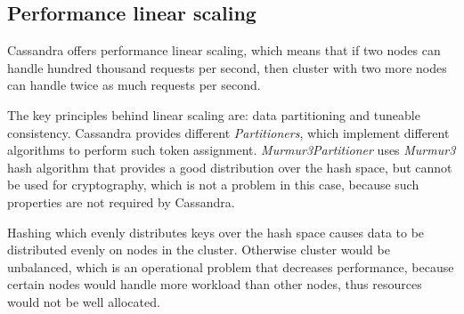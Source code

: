 
\subsection{Performance linear scaling}
\label{sec:theory:cassandra:linear}
Cassandra offers performance linear scaling, which means that if two nodes can handle hundred thousand requests per second, then cluster with two more nodes can handle twice as much requests per second. 

The key principles behind linear scaling are: data partitioning and tuneable consistency. 
Cassandra provides different \emph{Partitioners}, which implement different algorithms to perform such token assignment. \emph{Murmur3Partitioner} uses \emph{Murmur3} \cite{Murmur3} hash algorithm that provides a good distribution over the hash space, but cannot be used for cryptography, which is not a problem in this case, because such properties are not required by Cassandra.

Hashing which evenly distributes keys over the hash space causes data to be distributed evenly on nodes in the cluster. Otherwise cluster would be unbalanced, which is an operational problem that decreases performance, because certain nodes would handle more workload than other nodes, thus resources would not be well allocated.




